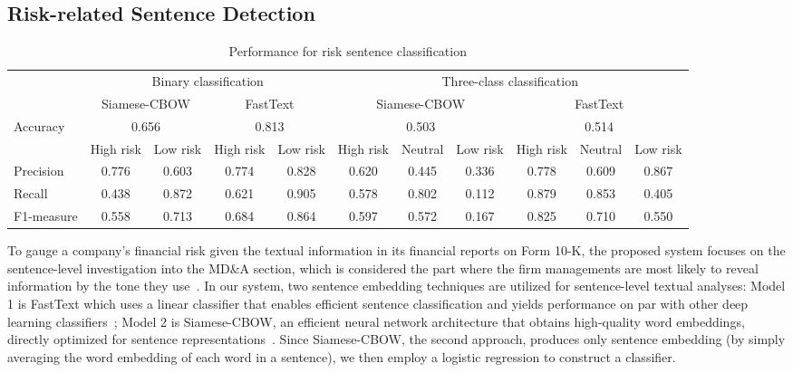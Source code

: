 \documentclass[10pt,conference,letterpaper]{IEEEtran}
\begin{document}
\subsection{Risk-related Sentence Detection}
\begin{table}[ht]
    \centering
    \caption{Performance for risk sentence classification}\label{tab:precision}
    \begin{tabular}{|l|c|c|c|c|c|c|c|c|c|c|}
        \hline
        & \multicolumn{4}{c|}{Binary classification} & \multicolumn{6}{c|}{Three-class classification}\\
        \cline{2-11}
         & \multicolumn{2}{c|}{Siamese-CBOW} & \multicolumn{2}{c|}{FastText} & \multicolumn{3}{c|}{Siamese-CBOW} & \multicolumn{3}{c|}{FastText}\\
        \hline
        Accuracy & \multicolumn{2}{c|}{0.656} & \multicolumn{2}{c|}{0.813} & \multicolumn{3}{c|}{0.503} & \multicolumn{3}{c|}{0.514} \\
        \cline{2-11}
        & High risk & Low risk  & High risk & Low risk  & High risk & Neutral  & Low risk & High risk & Neutral & Low risk  \\
        \hline
        Precision & 0.776 & 0.603 & 0.774 & 0.828 & 0.620 & 0.445 & 0.336 & 0.778 & 0.609 & 0.867 \\
        \hline
        Recall & 0.438 & 0.872 & 0.621 & 0.905 & 0.578 & 0.802 & 0.112 & 0.879 & 0.853 & 0.405 \\
        \hline
        F1-measure& 0.558 & 0.713 & 0.684 & 0.864 & 0.597 & 0.572 & 0.167 & 0.825 & 0.710 & 0.550 \\
        \hline
    \end{tabular}
\end{table}

    To gauge a company's financial risk given the textual information in its financial reports on Form 10-K, the proposed system focuses on the sentence-level investigation into the MD\&A section, which is considered the part where the firm managements are most likely to reveal information by the tone they use~\cite{loughran2011liability}. In our system, two sentence embedding techniques are utilized for sentence-level textual analyses: Model 1 is FastText which uses a linear classifier that enables efficient sentence classification and yields performance on par with other deep learning classifiers~\cite{bojanowski2016enriching}; Model 2 is Siamese-CBOW, an efficient neural network architecture that obtains high-quality word embeddings, directly optimized for sentence representations~\cite{kenter2016siamese}. Since Siamese-CBOW, the second approach, produces only sentence embedding (by simply averaging the word embedding of each word in a sentence), we then employ a logistic regression to construct a classifier.
\end{document}
